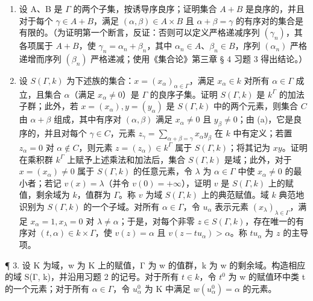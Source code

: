 \begin{enumerate}
\def\labelenumi{(\alph{enumi})}
\item
  设 A、B 是 \(\Gamma\) 的两个子集，按诱导序良序；证明集合 \(A + B\) 是良序的，并且对于每个 \(\gamma \in A + B\)，满足 \((\alpha, \beta) \in A \times B\) 且 \(\alpha + \beta = \gamma\) 的有序对的集合是有限的。（为证明第一个断言，反证：否则可以定义严格递减序列 \((\gamma_n)\)，其各项属于 \(A + B\)，使 \(\gamma_n = \alpha_n + \beta_n\)，其中 \(\alpha_n \in A\)、\(\beta_n \in B\)，序列 \((\alpha_n)\) 严格递增而序列 \((\beta_n)\) 严格递减；使用《集合论》第三章 § 4 习题 3 得出结论。）
\item
  设 \(S(\Gamma, k)\) 为下述族的集合：\(x = (x_{\alpha})_{\alpha \in \Gamma}\)，满足 \(x_{\alpha} \in k\) 对所有 \(\alpha \in \Gamma\) 成立，且集合 \(\alpha\)（满足 \(x_{\alpha} \neq 0\)）是 \(\Gamma\) 的良序子集。证明 \(S(\Gamma, k)\) 是 \(k^{\Gamma}\) 的加法子群；此外，若 \(x = (x_{\alpha}), y = (y_{\alpha})\) 是 \(S(\Gamma, k)\) 中的两个元素，则集合 \(C\) 由 \(\alpha + \beta\) 组成，其中有序对 \((\alpha, \beta)\) 满足 \(x_{\alpha} \neq 0\) 且 \(y_{\beta} \neq 0\)；由 (a)，它是良序的，并且对每个 \(\gamma \in C\)，元素 \(z_{\gamma} = \sum_{\alpha + \beta = \gamma} x_{\alpha} y_{\beta}\) 在 \(k\) 中有定义；若置 \(z_{\alpha} = 0\) 对 \(\alpha \notin C\)，则元素 \(z = (z_{\alpha}) \in k^{\Gamma}\) 属于 \(S(\Gamma, k)\)；将其记为 \(xy\)。证明在乘积群 \(k^{\Gamma}\) 上赋予上述乘法和加法后，集合 \(S(\Gamma, k)\) 是域；此外，对于 \(x = (x_{\alpha}) \neq 0\) 属于 \(S(\Gamma, k)\) 的任意元素，令 \(\lambda\) 为 \(\alpha \in \Gamma\) 中使 \(x_{\alpha} \neq 0\) 的最小者；若记 \(v(x) = \lambda\)（并令 \(v(0) = +\infty\)），证明 \(v\) 是 \(S(\Gamma, k)\) 上的赋值，剩余域为 \(k\)，值群为 \(\Gamma\)。称 \(v\) 为域 \(S(\Gamma, k)\) 上的典范赋值。域 \(k\) 典范地识别为 \(S(\Gamma, k)\) 的一个子域。对所有 \(\alpha \in \Gamma\)，令 \(u_{\alpha}\) 表示元素 \((x_{\lambda})_{\lambda \in \Gamma}\)，满足 \(x_{\alpha} = 1, x_{\lambda} = 0\) 对 \(\lambda \neq \alpha\)；于是，对每个非零 \(z \in S(\Gamma, k)\)，存在唯一的有序对 \((t, \alpha) \in k \times \Gamma\)，使 \(v(z) = \alpha\) 且 \(v(z - tu_{\alpha}) > \alpha\)。称 \(tu_{\alpha}\) 为 \(z\) 的主导项。
\end{enumerate}

¶ 3. 设 K 为域，w 为 K 上的赋值，Γ 为 w 的值群，k 为 w 的剩余域。构造相应的域 S(Γ, k)，并沿用习题 2 的记号。对于所有 \(t \in k\)，令 \(t^{0}\) 为 w 的赋值环中类 t 的一个元素；对于所有 \(\alpha \in \Gamma\)，令 \(u_{\alpha}^{0}\) 为 K 中满足 \(w(u_{\alpha}^{0}) = \alpha\) 的元素。

